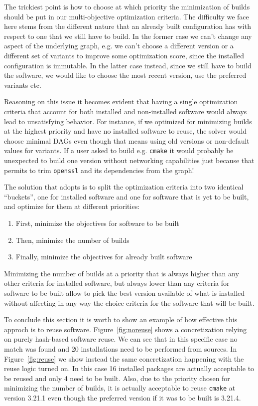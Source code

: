 The trickiest point is how to choose at which priority the minimization of builds should be put in our multi-objective optimization criteria. The difficulty we face here stems from the different nature that an already built configuration has with respect to one that we still have to build. In the former case we can't change any aspect of the underlying graph, e.g. we can't choose a different version or a different set of variants to improve some optimization score, since the installed configuration is immutable. In the latter case instead, since we still have to build the software, we would like to choose the most recent version, use the preferred variants etc. 

Reasoning on this issue it becomes evident that having a single optimization criteria that account for both installed and non-installed software would always lead to unsatisfying behavior. For instance, if we optimized for minimizing builds at the highest priority and have no installed software to reuse, the solver would choose minimal DAGs even though that means using old versions or non-default values for variants. If a user asked to build e.g. \texttt{cmake} it would probably be unexpected to build one version without networking capabilities just because that permits to trim \texttt{openssl} and its dependencies from the graph!

The solution that \spack{} adopts is to split the optimization criteria into two identical ``buckets'', one for installed software and one for software that is yet to be built, and optimize for them at different priorities:
\begin{enumerate}
\item First, minimize the objectives for software to be built
\item Then, minimize the number of builds
\item Finally, minimize the objectives for already built software
\end{enumerate}
Minimizing the number of builds at a priority that is always higher than any other criteria for installed software, but always lower than any criteria for software to be built allow \spack{} to pick the best version available of what is installed without affecting in any way the choice criteria for the software that will be built. 

To conclude this section it is worth to show an example of how effective this approch is to reuse software. Figure~\ref{fig:noreuse} shows a concretization relying on purely hash-based software reuse. We can see that in this specific case no match was found and 20 installations need to be performed from sources. In Figure~\ref{fig:reuse} we show instead the same concretization happening with the reuse logic turned on. In this case 16 installed packages are actually acceptable to be reused and only 4 need to be built. Also, due to the priority chosen for minimizing the number of builds, it is actually acceptable to reuse \texttt{cmake} at version 3.21.1 even though the preferred version if it was to be built is 3.21.4.

